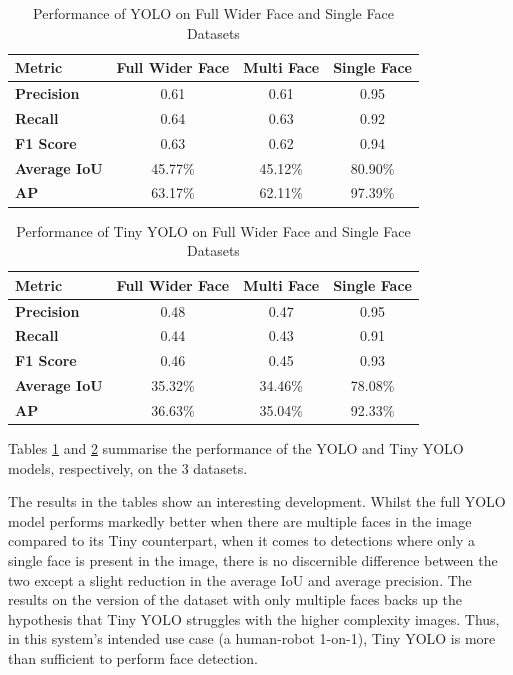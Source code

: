 \begin{table}[h!]
\centering{}
\caption{Performance of YOLO on Full Wider Face and Single Face Datasets}
\begin{tabular}{|l|c|c|c|}
\hline
\textbf{Metric}      & \textbf{Full Wider Face} & \textbf{Multi Face}  & \textbf{Single Face} \\ \hline
\textbf{Precision}   & 0.61        & 0.61            & 0.95                 \\ \hline
\textbf{Recall}      & 0.64        & 0.63            & 0.92                 \\ \hline
\textbf{F1 Score}    & 0.63        & 0.62            & 0.94                 \\ \hline
\textbf{Average IoU} & 45.77\%     & 45.12\%            & 80.90\%              \\ \hline
\textbf{AP}          & 63.17\%     & 62.11\%              & 97.39\%              \\ \hline
\end{tabular}
\label{tab:YOLO}
\end{table}

\begin{table}[h!]
\centering{}
\caption{Performance of Tiny YOLO on Full Wider Face and Single Face Datasets}
\begin{tabular}{|l|c|c|c|}
\hline
\textbf{Metric}      & \textbf{Full Wider Face} & \textbf{Multi Face}  & \textbf{Single Face} \\ \hline
\textbf{Precision}   & 0.48        & 0.47            & 0.95                 \\ \hline
\textbf{Recall}      & 0.44        & 0.43            & 0.91                 \\ \hline
\textbf{F1 Score}    & 0.46        & 0.45            & 0.93                 \\ \hline
\textbf{Average IoU} & 35.32\%     & 34.46\%            & 78.08\%              \\ \hline
\textbf{AP}          & 36.63\%     & 35.04\%             & 92.33\%              \\ \hline
\end{tabular}

\label{tab:TINYYOLO}
\end{table}

Tables \ref{tab:YOLO} and \ref{tab:TINYYOLO} summarise the performance of the YOLO and Tiny YOLO models, respectively, on the 3 datasets.

The results in the tables show an interesting development. Whilst the full YOLO model performs markedly better when there are multiple faces in the image compared to its Tiny counterpart, when it comes to detections where only a single face is present in the image, there is no discernible difference between the two except a slight reduction in the average IoU and average precision. The results on the version of the dataset with only multiple faces backs up the hypothesis that Tiny YOLO struggles with the higher complexity images. Thus, in this system's intended use case (a human-robot 1-on-1), Tiny YOLO is more than sufficient to perform face detection.

